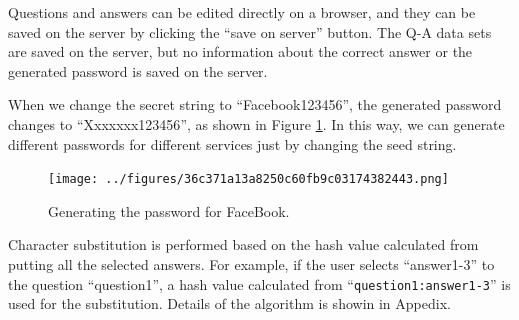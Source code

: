 \documentclass{article}
\begin{document}
Questions and answers can be edited directly on a browser, and they can be
saved on the server by clicking the ``save on server'' button.
The Q-A data sets are saved on the server,
but no information about the correct answer or the
generated password is saved on the server.


When we change the secret string to ``\textsf{Facebook123456}'',
the generated password changes to ``\textsf{Xxxxxxx123456}'',
as shown in Figure \ref{web2}.
In this way, we can generate different passwords for
different services just by changing the seed string.

\begin{figure}[H]
\centerline{\texttt{[image: ../figures/36c371a13a8250c60fb9c03174382443.png]}}
\caption{Generating the password for FaceBook.}
\label{web2}
\end{figure}



Character substitution is performed based on the hash value
calculated from putting all the selected answers.
For example, if the user selects ``answer1-3'' to the question ``question1'',
a hash value calculated from  ``\texttt{question1:answer1-3}''
is used for the substitution.
Details of the algorithm is showin in Appedix.



% 
% 
\end{document}
